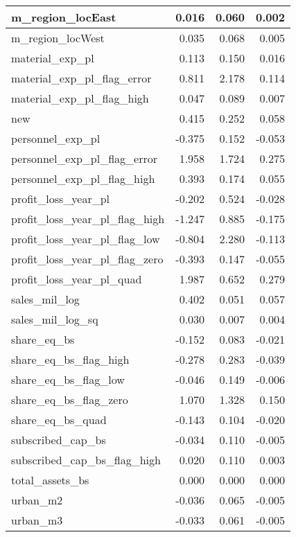 \begin{table}
\begin{tabular}[t]{l|r|r|r}
\hline
m\_region\_locEast & 0.016 & 0.060 & 0.002\\
\hline
m\_region\_locWest & 0.035 & 0.068 & 0.005\\
\hline
material\_exp\_pl & 0.113 & 0.150 & 0.016\\
\hline
material\_exp\_pl\_flag\_error & 0.811 & 2.178 & 0.114\\
\hline
material\_exp\_pl\_flag\_high & 0.047 & 0.089 & 0.007\\
\hline
new & 0.415 & 0.252 & 0.058\\
\hline
personnel\_exp\_pl & -0.375 & 0.152 & -0.053\\
\hline
personnel\_exp\_pl\_flag\_error & 1.958 & 1.724 & 0.275\\
\hline
personnel\_exp\_pl\_flag\_high & 0.393 & 0.174 & 0.055\\
\hline
profit\_loss\_year\_pl & -0.202 & 0.524 & -0.028\\
\hline
profit\_loss\_year\_pl\_flag\_high & -1.247 & 0.885 & -0.175\\
\hline
profit\_loss\_year\_pl\_flag\_low & -0.804 & 2.280 & -0.113\\
\hline
profit\_loss\_year\_pl\_flag\_zero & -0.393 & 0.147 & -0.055\\
\hline
profit\_loss\_year\_pl\_quad & 1.987 & 0.652 & 0.279\\
\hline
sales\_mil\_log & 0.402 & 0.051 & 0.057\\
\hline
sales\_mil\_log\_sq & 0.030 & 0.007 & 0.004\\
\hline
share\_eq\_bs & -0.152 & 0.083 & -0.021\\
\hline
share\_eq\_bs\_flag\_high & -0.278 & 0.283 & -0.039\\
\hline
share\_eq\_bs\_flag\_low & -0.046 & 0.149 & -0.006\\
\hline
share\_eq\_bs\_flag\_zero & 1.070 & 1.328 & 0.150\\
\hline
share\_eq\_bs\_quad & -0.143 & 0.104 & -0.020\\
\hline
subscribed\_cap\_bs & -0.034 & 0.110 & -0.005\\
\hline
subscribed\_cap\_bs\_flag\_high & 0.020 & 0.110 & 0.003\\
\hline
total\_assets\_bs & 0.000 & 0.000 & 0.000\\
\hline
urban\_m2 & -0.036 & 0.065 & -0.005\\
\hline
urban\_m3 & -0.033 & 0.061 & -0.005\\
\hline
\end{tabular}
\end{table}
